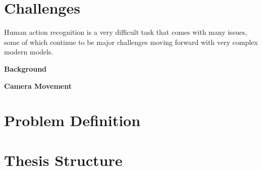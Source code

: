 \section{Challenges}

Human action recognition is a very difficult task that comes with many issues, some of which continue to be major challenges moving forward with very complex modern models.

\textbf{Background}

\textbf{Camera Movement}

\section{Problem Definition}

\section{Thesis Structure}